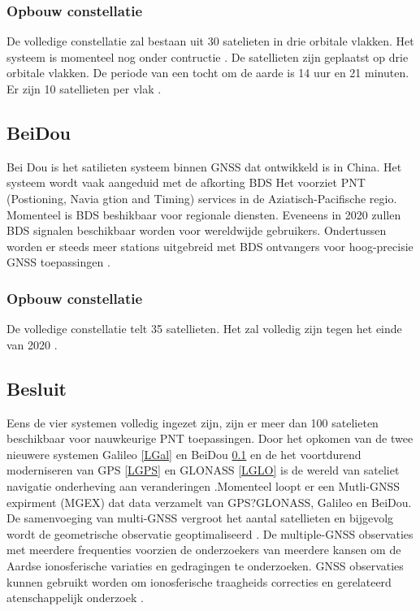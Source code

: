 \subsubsection{Opbouw constellatie}
De volledige constellatie zal bestaan  uit 30 satelieten in drie orbitale vlakken. Het systeem is momenteel nog onder contructie \cite{LBibGNSS4}. De satellieten zijn geplaatst op drie orbitale vlakken. De periode van een tocht om de aarde is 14 uur en 21 minuten. Er zijn 10 satellieten per vlak \cite{LBibGNSS6}. 
 
\subsection{BeiDou}
\label{LBeD}
Bei Dou is het satilieten systeem binnen GNSS dat ontwikkeld is in China. Het systeem wordt vaak  aangeduid met de afkorting BDS \cite{LBibBeiDou} Het voorziet PNT (Postioning, Navia gtion and Timing) services in de Aziatisch-Pacifische regio. Momenteel is BDS  beshikbaar voor regionale diensten. Eveneens in 2020 zullen BDS signalen beschikbaar worden voor wereldwijde gebruikers. Ondertussen worden er steeds meer stations uitgebreid met BDS ontvangers voor hoog-precisie GNSS toepassingen \cite{LBibBeiDou}.

\subsubsection{Opbouw constellatie}
De volledige constellatie telt 35 satellieten. Het zal volledig zijn tegen het einde van 2020 \cite{LBibGNSS4}.

\subsection{Besluit}
Eens de vier systemen volledig ingezet zijn, zijn er meer dan 100 satelieten beschikbaar voor nauwkeurige PNT toepassingen. Door het opkomen van de twee nieuwere systemen Galileo \ref{LGal} en BeiDou \ref{LBeD} en de het voortdurend moderniseren van GPS \ref{LGPS} en GLONASS \ref{LGLO} is de wereld van sateliet navigatie onderheving aan veranderingen \cite{LBibGNSS4}.Momenteel loopt er een Mutli-GNSS expirment (MGEX) dat data verzamelt van GPS?GLONASS, Galileo en BeiDou. De samenvoeging van multi-GNSS vergroot het aantal satellieten en bijgevolg wordt de geometrische observatie geoptimaliseerd \cite{LBibGNSS5}. De multiple-GNSS observaties met meerdere frequenties voorzien de onderzoekers van meerdere kansen om de Aardse ionosferische variaties en gedragingen te onderzoeken. GNSS observaties kunnen gebruikt worden om ionosferische traagheids correcties en gerelateerd atenschappelijk onderzoek \cite{LBibBeiDou}.

